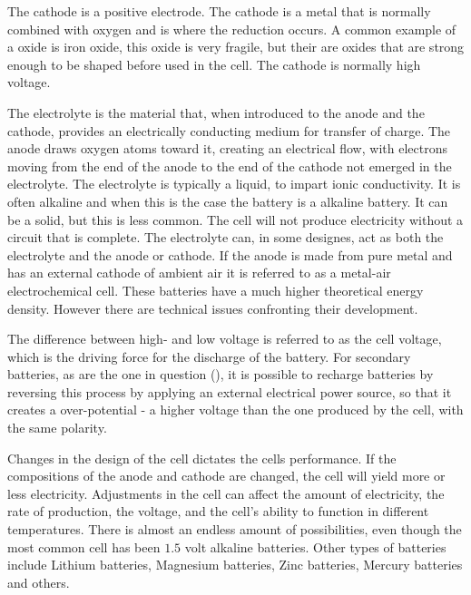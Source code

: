The cathode is a positive electrode. The cathode is a metal that is normally combined with oxygen and is where the reduction occurs. A common example of a oxide is iron oxide, this oxide is very fragile, but their are oxides that are strong enough to be shaped before used in the cell. The cathode is normally high voltage. 

The electrolyte is the material that, when introduced to the anode and the cathode, provides an electrically conducting medium for transfer of charge. The anode draws oxygen atoms toward it, creating an electrical flow, with electrons moving from the end of the anode to the end of the cathode not emerged in the electrolyte. The electrolyte is typically a liquid, to impart ionic conductivity. It is often alkaline and when this is the case the battery is a alkaline battery. It can be a solid, but this is less common. The cell will not produce electricity without a circuit that is complete. The electrolyte can, in some designes, act as both the electrolyte and the anode or cathode. If the anode is made from pure metal and has an external cathode of ambient air it is referred to as a metal-air electrochemical cell. These batteries have a much higher theoretical energy density. However there are technical issues confronting their development. \cite{li2017metal}


The difference between high- and low voltage is referred to as the cell voltage, which is the driving force for the discharge of the battery. For secondary batteries, as are the one in question (), it is possible to recharge batteries by reversing this process by applying an external electrical power source, so that it creates a over-potential - a higher voltage than the one produced by the cell, with the same polarity. 

Changes in the design of the cell dictates the cells performance. If the compositions of the anode and cathode are changed, the cell will yield more or less electricity. Adjustments in the cell can affect the amount of electricity, the rate of production, the voltage, and the cell's ability to function in different temperatures. There is almost an endless amount of possibilities, even though the most common cell has been $1.5$ volt alkaline batteries. Other types of batteries include Lithium  batteries, Magnesium batteries, Zinc batteries,  Mercury batteries and others. 


